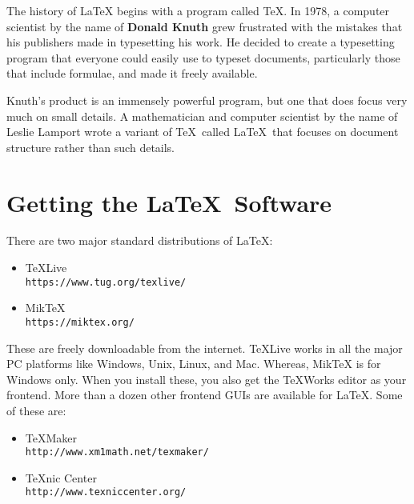 \documentclass[fleqn, 11pt, twoside]{IOEGC2019}
\begin{document}
The history of LaTeX begins with a program called \TeX. In 1978, a computer 
scientist by the name of \textbf{Donald Knuth} grew frustrated with the mistakes
that his publishers made in typesetting his work. He decided to create a 
typesetting program that everyone could easily use to typeset documents, 
particularly those that include formulae, and made it freely available. 

Knuth's product is an immensely powerful program, but one that does focus
very much on small details. A mathematician and computer scientist by the
name of Leslie Lamport wrote a variant of \TeX\ called \LaTeX\ that focuses on
document structure rather than such details.


\section{Getting the \LaTeX\ Software }\label{sec:getting}
There are two major standard distributions of \LaTeX:
\begin{itemize}[noitemsep]
	\item TeXLive \\ \texttt{\small{https://www.tug.org/texlive/}}
	\item MikTeX \\ \texttt{\small{https://miktex.org/}}
\end{itemize}

These are freely downloadable from the internet. TeXLive works in all the major 
PC platforms like Windows, Unix, Linux, and Mac. Whereas, MikTeX is for Windows 
only. When you install these, you also get the TeXWorks editor as your frontend.
More than a dozen other frontend GUIs are available for \LaTeX. 
Some of these are:

\begin{itemize}[noitemsep]
	\item TeXMaker \\ \texttt{\small{http://www.xm1math.net/texmaker/}}
	\item TeXnic Center\\ \texttt{\small{http://www.texniccenter.org/}}
\end{itemize}
\end{document}
